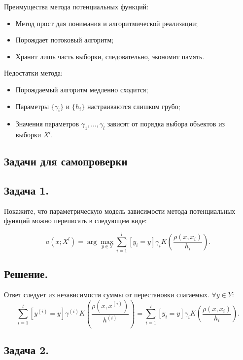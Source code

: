 Преимущества метода потенциальных функций:

\begin{itemize}
	\item Метод прост для понимания и алгоритмической реализации;
	\item Порождает потоковый алгоритм; 
	\item Хранит лишь часть выборки, следовательно, экономит память.
\end{itemize}

\noindent Недостатки метода:

\begin{itemize}
	\item Порождаемый алгоритм медленно сходится;
	\item Параметры $\{\gamma_i\}$ и $\{h_i\}$ настраиваются слишком грубо; 
	\item Значения параметров $\gamma_1,\dots,\gamma_l$ зависят от порядка выбора объектов из выборки $X^l$.
\end{itemize}

\subsection{Задачи для самопроверки}

\subsection*{Задача 1.}
Покажите, что параметрическую модель зависимости метода потенциальных функций можно переписать в следующем виде:

\begin{equation*}
	\displaystyle a(x; X^l) = \arg\max_{y\in Y} \sum\limits_{i=1}^l[y_i=y]\gamma_i K\left(\frac{\rho(x, x_i)}{h_i}\right).
\end{equation*}

\subsection*{Решение.}

Ответ следует из независимости суммы от перестановки слагаемых. $\forall y \in Y$:
\begin{equation*}
	\displaystyle 
	\sum\limits_{i=1}^l[y^{(i)}=y]\gamma^{(i)} K\left(\frac{\rho(x, x^{(i)})}{h^{(i)}}\right)
	= \sum\limits_{i=1}^l[y_i=y]\gamma_i K\left(\frac{\rho(x, x_i)}{h_i}\right).
\end{equation*}


\subsection*{Задача 2.}

